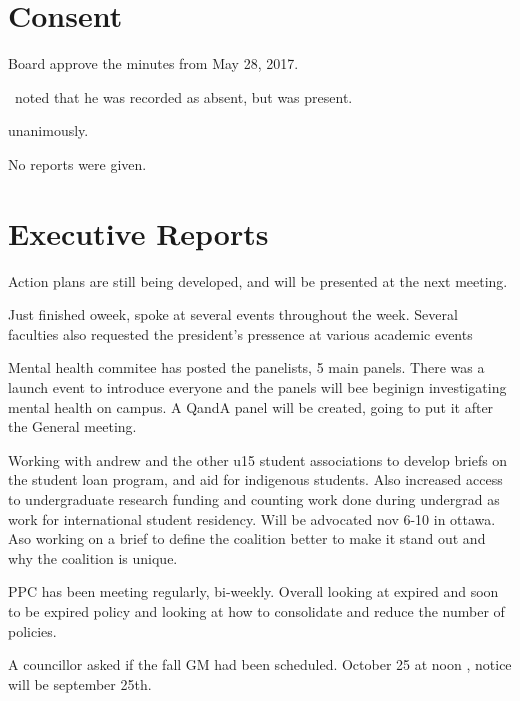 \section*{Consent}

\begin{motion}
    \birt Board approve the minutes from May 28, 2017.
    \movers{\tristan}{\elizabeth}

    \seneca\ noted that he was recorded as absent, but was present.

    \carries unanimously.
\end{motion}

\begin{information}
    No reports were given.
\end{information}

\section*{Executive Reports}

Action plans are still being developed, and will be presented at the 
next meeting. 


    Just finished oweek, spoke at several events throughout the week. Several
    faculties also requested the president's pressence at various academic events

    Mental health commitee has posted the panelists, 5 main panels. There
    was a launch event to introduce everyone and the panels will bee beginign
    investigating mental health on campus. A QandA panel will be created, 
    going to put it after the General meeting. 

    Working with andrew and the other u15 student associations to develop briefs
    on the student loan program, and aid for indigenous students. Also increased
    access to undergraduate research funding and counting work done during 
    undergrad as work for international student residency. Will be advocated nov
    6-10 in ottawa. Aso working on a brief to define the coalition better to
    make it stand out and why the coalition is unique. 

    PPC has been meeting regularly, bi-weekly. Overall looking at expired and
    soon to be expired policy and looking at how to consolidate and reduce
    the number of policies. 
    
    A councillor asked if the fall GM had been scheduled. October 25 at noon
    , notice will be september 25th. 

